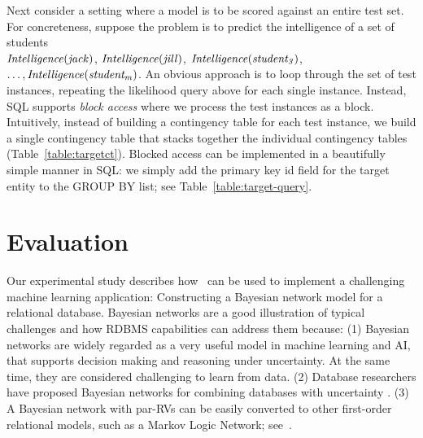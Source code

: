 %
Next consider a setting where a model is to be scored against an entire test set. 
For concreteness, suppose the problem is to predict the intelligence of a set of students\\
 $\it{Intelligence}(jack)$, $\it{Intelligence}(jill)$,
 $\it{Intelligence}(student_{3})$,\\$\ldots, \it{Intelligence}(student_{m})$.
An obvious approach is to loop through the set of test instances, repeating the likelihood query above for each single instance. Instead, 
 SQL supports {\em block access} where we process the test instances as a block. Intuitively, instead of building a contingency table for each test instance, we build a single contingency table that stacks together the individual contingency tables (Table~\ref{table:targetct}). Blocked access can be implemented in a beautifully simple manner in SQL: we simply add the primary key id field for the target entity to the GROUP BY list; see Table~\ref{table:target-query}. 

\section{Evaluation} 
Our experimental study describes how \FB\ can be used to implement a challenging machine learning application: Constructing a Bayesian network model for a relational database. Bayesian networks are a good illustration of typical challenges and how RDBMS capabilities can address them because: (1) Bayesian networks are widely regarded as a very useful model %
 in machine learning and AI, that supports decision making and reasoning under uncertainty. At the same time, they are considered challenging to learn from data. (2) Database researchers have proposed Bayesian networks for combining databases with uncertainty%
\cite{Wang2008}. (3) A Bayesian network with par-RVs can be easily converted to other first-order relational models, such as a Markov Logic Network; see~\cite{Domingos2009,Schulte2016}.

